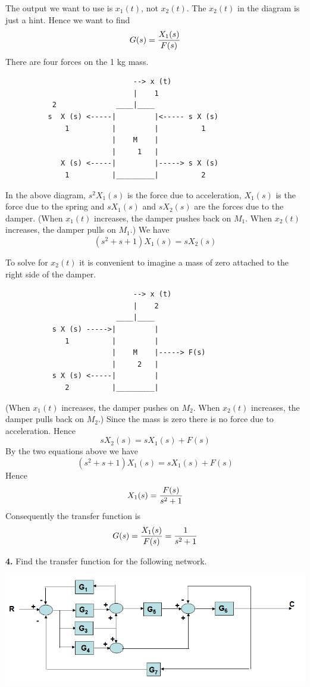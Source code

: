 \documentclass[11pt]{report}
\begin{document}
\bigskip
\noindent
The output we want to use is $x_1(t)$, not $x_2(t)$.
The $x_2(t)$ in the diagram is just a hint.
Hence we want to find
$$G(s)={X_1(s)\over F(s)}$$
There are four forces on the 1 kg mass.
\begin{verbatim}
                              --> x (t)
                              |    1
           2              ____|____
          s  X (s) <-----|         |<----- s X (s)
              1          |         |          1
                         |    M    |
                         |     1   |
             X (s) <-----|         |-----> s X (s)
              1          |_________|          2
\end{verbatim}
In the above diagram, $s^2X_1(s)$ is the force due to acceleration,
$X_1(s)$ is the force due to the spring and
$sX_1(s)$ and $sX_2(s)$ are the forces due to the damper.
(When $x_1(t)$ increases, the damper pushes back on $M_1$.
When $x_2(t)$ increases, the damper pulls on $M_1$.)
We have
$$(s^2+s+1)X_1(s)=sX_2(s)$$

\newpage

\noindent
To solve for $x_2(t)$ it is convenient to imagine a mass of zero attached
to the right side of the damper.
\begin{verbatim}
                              --> x (t)
                              |    2
                          ____|____
           s X (s) ----->|         |
              1          |         |
                         |    M    |-----> F(s)
                         |     2   |
           s X (s) <-----|         |
              2          |_________|
\end{verbatim}
(When $x_1(t)$ increases, the damper pushes on $M_2$.
When $x_2(t)$ increases, the damper pulls back on $M_2$.)
Since the mass is zero there is no force due to acceleration.
Hence
$$sX_2(s)=sX_1(s)+F(s)$$
By the two equations above we have
$$(s^2+s+1)X_1(s)=sX_1(s)+F(s)$$
Hence
$$X_1(s)={F(s)\over s^2+1}$$
Consequently the transfer function is
$$G(s)={X_1(s)\over F(s)}={1\over s^2+1}$$

\newpage

\noindent
{\bf 4.} Find the transfer function for the following network.
\begin{center}
\includegraphics[scale=0.25]{images/210-3.png}
\end{center}
\end{document}

